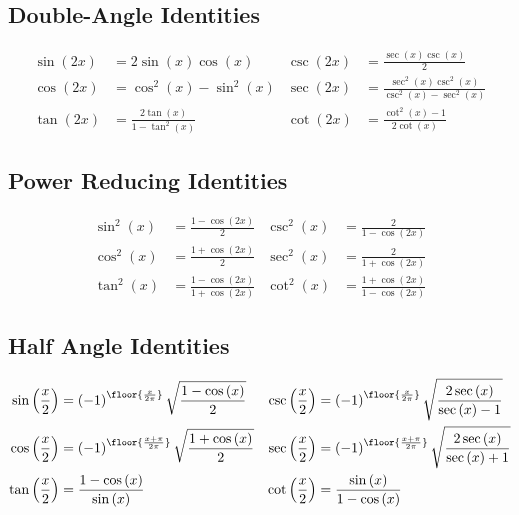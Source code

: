 \documentclass{article}
\begin{document}
\subsection{Double-Angle Identities}
\begin{align*}
    \sin{\left( 2x \right)} & = 2\sin{\left( x \right)}\cos{\left( x \right)}              & \csc{\left( 2x \right)} & = \frac{\sec{\left( x \right)}\csc{\left( x \right)}}{2}                                                     \\
    \cos{\left( 2x \right)} & = \cos^2{\left( x \right)} - \sin^2{\left( x \right)}        & \sec{\left( 2x \right)} & = \frac{\sec^2{\left( x \right)}\csc^2{\left( x \right)}}{\csc^2{\left( x \right)}-\sec^2{\left( x \right)}} \\
    \tan{\left( 2x \right)} & = \frac{2\tan{\left( x \right)}}{1-\tan^2{\left( x \right)}} & \cot{\left( 2x \right)} & = \frac{\cot^2{\left( x \right)}-1}{2\cot{\left( x \right)}}
\end{align*}
\subsection{Power Reducing Identities}
\begin{align*}
    \sin^2{\left( x \right)} & = \frac{1-\cos{\left( 2x \right)}}{2}                         & \csc^2{\left( x \right)} & = \frac{2}{1-\cos{\left( 2x \right)}}                         \\
    \cos^2{\left( x \right)} & = \frac{1+\cos{\left( 2x \right)}}{2}                         & \sec^2{\left( x \right)} & = \frac{2}{1+\cos{\left( 2x \right)}}                         \\
    \tan^2{\left( x \right)} & = \frac{1-\cos{\left( 2x \right)}}{1+\cos{\left( 2x \right)}} & \cot^2{\left( x \right)} & = \frac{1+\cos{\left( 2x \right)}}{1-\cos{\left( 2x \right)}}
\end{align*}
\subsection{Half Angle Identities}
\begin{align*}
    \sin{\left( \frac{x}{2} \right)} & = \left( -1 \right)^{\floor{\frac{x}{2\pi}}}\sqrt{\frac{1-\cos{\left( x \right)}}{2}}     & \csc{\left( \frac{x}{2} \right)} & = \left( -1 \right)^{\floor{\frac{x}{2\pi}}} \sqrt{\frac{2\sec{\left( x \right)}}{\sec{\left( x \right)}-1}}     \\
    \cos{\left( \frac{x}{2} \right)} & = \left( -1 \right)^{\floor{\frac{x+\pi}{2\pi}}}\sqrt{\frac{1+\cos{\left( x \right)}}{2}} & \sec{\left( \frac{x}{2} \right)} & = \left( -1 \right)^{\floor{\frac{x+\pi}{2\pi}}} \sqrt{\frac{2\sec{\left( x \right)}}{\sec{\left( x \right)}+1}} \\
    \tan{\left( \frac{x}{2} \right)} & = \frac{1-\cos{\left( x \right)}}{\sin{\left( x \right)}}                                 & \cot{\left( \frac{x}{2} \right)} & = \frac{\sin{\left( x \right)}}{1-\cos{\left( x \right)}}
\end{align*}
\end{document}
